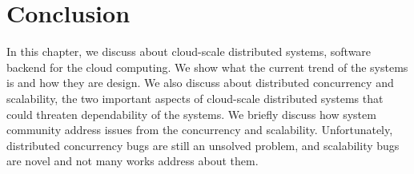 \section{Conclusion}

In this chapter, we discuss about cloud-scale distributed systems, software
backend for the cloud computing. We show what the current trend of the systems
is and how they are design. We also discuss about distributed concurrency and
scalability, the two important aspects of cloud-scale distributed systems that
could threaten dependability of the systems. We briefly discuss how system
community address issues from the concurrency and scalability. Unfortunately,
distributed concurrency bugs are still an unsolved problem, and scalability bugs
are novel and not many works address about them.

